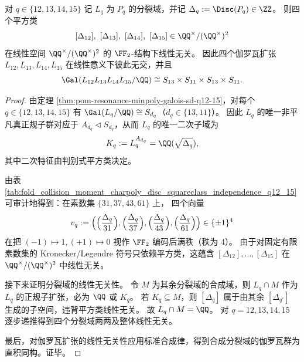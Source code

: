 \begin{theorem}[判别式二次特征的角色独立性与分裂域直积伽罗瓦群]\label{thm:pom-resonance-disc-squareclass-independence-q12-15}
对 \(q\in\{12,13,14,15\}\) 记 \(L_q\) 为 \(P_q\) 的分裂域，并记 \(\Delta_q:=\Disc(P_q)\in\ZZ\)。
则四个平方类
\[
[\Delta_{12}],\ [\Delta_{13}],\ [\Delta_{14}],\ [\Delta_{15}]\in \QQ^\times/(\QQ^\times)^2
\]
在线性空间 \(\QQ^\times/(\QQ^\times)^2\) 的 \(\FF_2\)-结构下线性无关。
因此四个伽罗瓦扩张 \(L_{12},L_{13},L_{14},L_{15}\) 在线性意义下彼此无交，并且
\[
\Gal(L_{12}L_{13}L_{14}L_{15}/\QQ)\cong S_{13}\times S_{11}\times S_{13}\times S_{11}.
\]
\end{theorem}
\begin{proof}
由定理 \ref{thm:pom-resonance-minpoly-galois-sd-q12-15}，对每个 \(q\in\{12,13,14,15\}\) 有 \(\Gal(L_q/\QQ)\cong S_{d_q}\)（\(d_q\in\{13,11\}\)）。
因此 \(L_q\) 的唯一非平凡真正规子群对应于 \(A_{d_q}\triangleleft S_{d_q}\)，从而 \(L_q\) 的唯一二次子域为
\[
K_q:=L_q^{A_{d_q}}=\QQ(\sqrt{\Delta_q}),
\]
其中二次特征由判别式平方类决定。

由表 \ref{tab:fold_collision_moment_charpoly_disc_squareclass_independence_q12_15} 可审计地得到：在素数集 \(\{31,37,43,61\}\) 上，
四个向量
\[
v_q:=\Bigl(\Bigl(\frac{\Delta_q}{31}\Bigr),\Bigl(\frac{\Delta_q}{37}\Bigr),\Bigl(\frac{\Delta_q}{43}\Bigr),\Bigl(\frac{\Delta_q}{61}\Bigr)\Bigr)\in\{\pm 1\}^4
\]
在把 \((-1)\mapsto 1,(+1)\mapsto 0\) 视作 \(\FF_2\) 编码后满秩（秩为 \(4\)）。
由于对固定有限素数集的 Kronecker/Legendre 符号只依赖平方类，这蕴含 \([\Delta_{12}],\dots,[\Delta_{15}]\) 在 \(\QQ^\times/(\QQ^\times)^2\) 中线性无关。

接下来证明分裂域的线性无关性。
令 \(M\) 为其余分裂域的合成域，则 \(L_q\cap M\) 作为 \(L_q\) 的正规子扩张，必为 \(\QQ\) 或 \(K_q\)。
若 \(K_q\subseteq M\)，则 \([\Delta_q]\) 属于由其余 \([\Delta_{q'}]\) 生成的子空间，违背平方类线性无关。
故 \(L_q\cap M=\QQ\)。
对 \(q=12,13,14,15\) 逐步递推得到四个分裂域两两及整体线性无关。

最后，对伽罗瓦扩张的线性无关性应用标准合成律，得到合成分裂域的伽罗瓦群为直积同构。证毕。
\end{proof}


